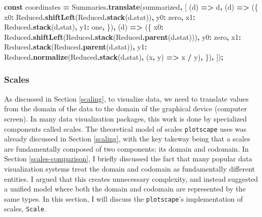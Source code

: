\documentclass[
  openany]{book}
\newenvironment{Shaded}{\begin{snugshade}}{\end{snugshade}}
\newcommand{\AttributeTok}[1]{\textcolor[rgb]{0.13,0.29,0.53}{#1}}
\newcommand{\FunctionTok}[1]{\textcolor[rgb]{0.13,0.29,0.53}{\textbf{#1}}}
\newcommand{\KeywordTok}[1]{\textcolor[rgb]{0.13,0.29,0.53}{\textbf{#1}}}
\newcommand{\NormalTok}[1]{#1}
\newcommand{\OperatorTok}[1]{\textcolor[rgb]{0.81,0.36,0.00}{\textbf{#1}}}
\theoremstyle{definition}
\theoremstyle{definition}
\theoremstyle{definition}
\theoremstyle{definition}
\theoremstyle{remark}
\begin{document}
\begin{Shaded}
\begin{Highlighting}[]
\KeywordTok{const}\NormalTok{ coordinates }\OperatorTok{=}\NormalTok{ Summaries}\OperatorTok{.}\FunctionTok{translate}\NormalTok{(summarized}\OperatorTok{,}\NormalTok{ [}
\NormalTok{  (d) }\KeywordTok{=\textgreater{}}\NormalTok{ d}\OperatorTok{,}
\NormalTok{  (d) }\KeywordTok{=\textgreater{}}\NormalTok{ (\{}
\NormalTok{    x0}\OperatorTok{:}\NormalTok{ Reduced}\OperatorTok{.}\FunctionTok{shiftLeft}\NormalTok{(Reduced}\OperatorTok{.}\FunctionTok{stack}\NormalTok{(d}\OperatorTok{.}\AttributeTok{stat}\NormalTok{))}\OperatorTok{,}
\NormalTok{    y0}\OperatorTok{:}\NormalTok{ zero}\OperatorTok{,}
\NormalTok{    x1}\OperatorTok{:}\NormalTok{ Reduced}\OperatorTok{.}\FunctionTok{stack}\NormalTok{(d}\OperatorTok{.}\AttributeTok{stat}\NormalTok{)}\OperatorTok{,}
\NormalTok{    y1}\OperatorTok{:}\NormalTok{ one}\OperatorTok{,}
\NormalTok{  \})}\OperatorTok{,}
\NormalTok{  (d) }\KeywordTok{=\textgreater{}}\NormalTok{ (\{}
\NormalTok{    x0}\OperatorTok{:}\NormalTok{ Reduced}\OperatorTok{.}\FunctionTok{shiftLeft}\NormalTok{(Reduced}\OperatorTok{.}\FunctionTok{stack}\NormalTok{(Reduced}\OperatorTok{.}\FunctionTok{parent}\NormalTok{(d}\OperatorTok{.}\AttributeTok{stat}\NormalTok{)))}\OperatorTok{,}
\NormalTok{    y0}\OperatorTok{:}\NormalTok{ zero}\OperatorTok{,}
\NormalTok{    x1}\OperatorTok{:}\NormalTok{ Reduced}\OperatorTok{.}\FunctionTok{stack}\NormalTok{(Reduced}\OperatorTok{.}\FunctionTok{parent}\NormalTok{(d}\OperatorTok{.}\AttributeTok{stat}\NormalTok{))}\OperatorTok{,}
\NormalTok{    y1}\OperatorTok{:}\NormalTok{ Reduced}\OperatorTok{.}\FunctionTok{normalize}\NormalTok{(Reduced}\OperatorTok{.}\FunctionTok{stack}\NormalTok{(d}\OperatorTok{.}\AttributeTok{stat}\NormalTok{)}\OperatorTok{,}\NormalTok{ (x}\OperatorTok{,}\NormalTok{ y) }\KeywordTok{=\textgreater{}}\NormalTok{ x }\OperatorTok{/}\NormalTok{ y)}\OperatorTok{,}
\NormalTok{  \})}\OperatorTok{,}
\NormalTok{])}\OperatorTok{;}
\end{Highlighting}
\end{Shaded}

\subsubsection{Scales}\label{scales}

As discussed in Section \ref{scaling}, to visualize data, we need to translate values from the domain of the data to the domain of the graphical device (computer screen). In many data visualization packages, this work is done by specialized components called scales. The theoretical model of scales \texttt{plotscape} uses was already discussed in Section \ref{scaling}, with the key takeway being that a scales are fundamentally composed of two components: its domain and codomain. In Section \ref{scales-comparison}, I briefly discussed the fact that many popular data visualization systems treat the domain and codomain as fundamentally different entities. I argued that this creates unnecessary complexity, and instead suggested a unified model where both the domain and codomain are represented by the same types. In this section, I will discuss the \texttt{plotscape}'s implementation of scales, \texttt{Scale}.
\end{document}
